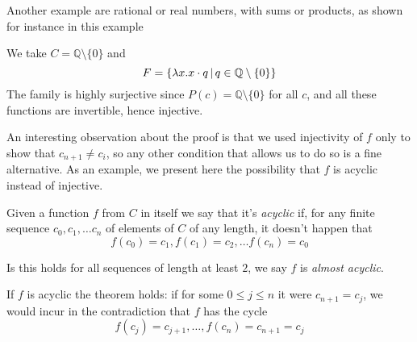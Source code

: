 Another example are rational or real numbers, with sums or products, as shown for instance in this example
\begin{example}
	We take $C = \mathbb{Q} \setminus \{ 0 \}$ and
	\[
	F = \{ \lambda x. x \cdot q \,\vert\, q \in \mathbb{Q} \setminus \{ 0 \} \}
	\]
	The family is highly surjective since $P(c) = \mathbb{Q} \setminus \{ 0 \}$ for all $c$, and all these functions are invertible, hence injective.
\end{example}

An interesting observation about the proof is that we used injectivity of $f$ only to show that $c_{n+1} \neq c_i$, so any other condition that allows us to do so is a fine alternative. As an example, we present here the possibility that $f$ is acyclic instead of injective.
\begin{definition}
	Given a function $f$ from $C$ in itself we say that it's \textit{acyclic} if, for any finite sequence $c_0, c_1, \dots c_n$ of elements of $C$ of any length, it doesn't happen that
	\[
	f(c_0) = c_1, f(c_1) = c_2, \dots f(c_n) = c_0
	\]

	Is this holds for all sequences of length at least $2$, we say $f$ is \textit{almost acyclic}.
\end{definition}
If $f$ is acyclic the theorem holds: if for some $0 \le j \le n$ it were $c_{n+1} = c_j$, we would incur in the contradiction that $f$ has the cycle
\[
f(c_j) = c_{j+1}, \dots, f(c_n) = c_{n+1} = c_j
\]

